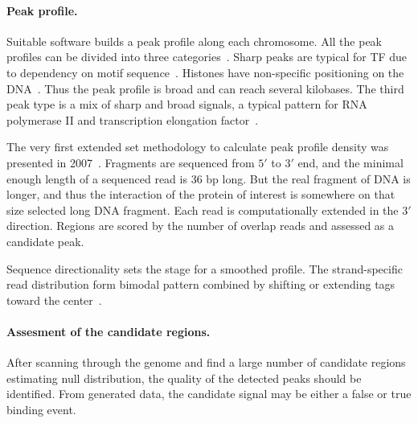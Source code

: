 \paragraph{Peak profile.}
Suitable software builds a peak profile along each chromosome. 
All the peak profiles can be divided into three categories~\cite{park2009chip}. 
Sharp peaks are typical for TF due to dependency on motif sequence~\cite{landt2012chip}. 
Histones have non-specific positioning on the DNA~\cite{krig2007identification}. 
Thus the peak profile is broad and can reach several kilobases. 
The third peak type is a mix of sharp and broad signals, a typical pattern for RNA polymerase II and transcription elongation factor~\cite{squazzo2006suz12, lin2011dynamic}.



The very first extended set methodology to calculate peak profile density was presented in 2007~\cite{robertson2007genome}. 
Fragments are sequenced from $5'$ to $3'$ end, and the minimal enough length of a sequenced read is 36 bp long. 
But the real fragment of DNA is longer, and thus the interaction of the protein of interest is somewhere on that size selected long DNA fragment. 
Each read is computationally extended in the $3'$ direction. 
Regions are scored by the number of overlap reads and assessed as a candidate peak.



Sequence directionality sets the stage for a smoothed profile. 
The strand-specific read distribution form bimodal pattern combined by shifting or extending tags toward the center~\cite{valouev2008genome}.









\paragraph{Assesment of the candidate regions.}
After scanning through the genome and find a large number of candidate regions estimating null distribution, the quality of the detected peaks should be identified. 
From generated data, the candidate signal may be either a false or true binding event. 

